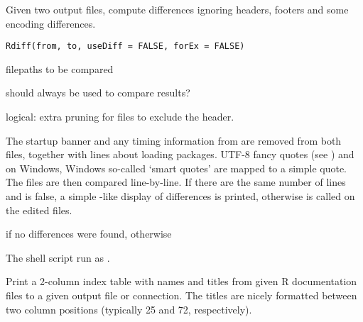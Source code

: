 %
\begin{Description}\relax
Given two \R{} output files, compute differences ignoring headers,
footers and some encoding differences.
\end{Description}
%
\begin{Usage}
\begin{verbatim}
Rdiff(from, to, useDiff = FALSE, forEx = FALSE)
\end{verbatim}
\end{Usage}
%
\begin{Arguments}
\begin{ldescription}
\item[\code{from, to}] filepaths to be compared
\item[\code{useDiff}] should  always be used to compare
results?
\item[\code{forEx}] logical: extra pruning for  files to
exclude the header.
\end{ldescription}
\end{Arguments}
%
\begin{Details}\relax
The \R{} startup banner and any timing information from  are removed from both files, together with lines about
loading packages.  UTF-8 fancy quotes (see ) and on
Windows, Windows so-called `smart quotes' are mapped to a
simple quote.  The files are then compared line-by-line.  If there are
the same number of lines and  is false, a simple
-like display of differences is printed, otherwise
 is called on the edited files.
\end{Details}
%
\begin{Value}
 if no differences were found, otherwise 
\end{Value}
%
\begin{SeeAlso}\relax
The shell script run as .
\end{SeeAlso}
%
\begin{Description}\relax
Print a 2-column index table with names and titles from given
R documentation files to a given output file or connection.  The
titles are nicely formatted between two column positions (typically 25
and 72, respectively).
\end{Description}
